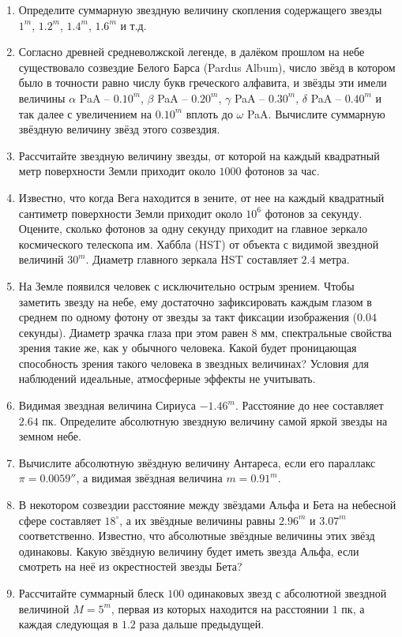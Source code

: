 \documentclass[12pt]{article}
\begin{document}
\begin{enumerate}
    \item Определите суммарную звездную величину скопления содержащего звезды $1^{m}$, $1.2^{m}$, $1.4^{m}$, $1.6^{m}$ и т.д.
    \item Согласно древней средневолжской легенде, в далёком прошлом на небе существовало созвездие Белого Барса (Pardus Album), число звёзд в котором было в точности равно числу букв греческого алфавита, и звёзды эти имели величины $\alpha$ PaA -- $0.10^m$, $\beta$ PaA -- $0.20^m$, $\gamma$ PaA -- $0.30^m$, $\delta$ PaA -- $0.40^m$ и так далее с увеличением на $0.10^m$ вплоть до $\omega$ PaA. Вычислите суммарную звёздную величину звёзд этого созвездия.
    \item Рассчитайте звездную величину звезды, от которой на каждый квадратный метр поверхности Земли приходит около $1000$ фотонов за час.
    \item Известно, что когда Вега находится в зените, от нее на каждый квадратный сантиметр поверхности Земли приходит около $10^6$ фотонов за секунду. Оцените, сколько фотонов за одну секунду приходит на главное зеркало космического телескопа им. Хаббла (HST) от объекта с видимой звездной величинй $30^m$. Диаметр главного зеркала HST составляет $2.4$ метра.
    \item На Земле появился человек с исключительно острым зрением. Чтобы заметить звезду на небе, ему достаточно зафиксировать каждым глазом в среднем по одному фотону от звезды за такт фиксации изображения ($0.04$ секунды). Диаметр зрачка глаза при этом равен $8$ мм, спектральные свойства зрения такие же, как у обычного человека. Какой будет проницающая способность зрения такого человека в звездных величинах? Условия для наблюдений идеальные, атмосферные эффекты не учитывать.
    \item Видимая звездная величина Сириуса  $-1.46^m$. Расстояние до нее составляет $2.64$ пк. Определите абсолютную звездную величину самой яркой звезды на земном небе.
    \item Вычислите абсолютную звёздную величину Антареса, если его параллакс $\pi = 0.0059''$, а видимая звёздная величина $m = 0.91^{m}$.
    \item В некотором созвездии расстояние между звёздами Альфа и Бета на небесной сфере составляет $18^{\circ}$, а их звёздные величины равны $2.96^m$ и $3.07^m$ соответственно. Известно, что абсолютные звёздные величины этих звёзд одинаковы. Какую звёздную величину будет иметь звезда Альфа, если смотреть на неё из окрестностей звезды Бета?
    \item Рассчитайте суммарный блеск $100$ одинаковых звезд с абсолютной звездной величиной $M=5^m$, первая из которых находится на расстоянии $1$ пк, а каждая следующая в $1.2$ раза дальше предыдущей.

\end{enumerate}
\end{document}
